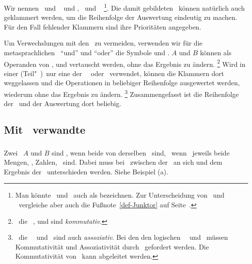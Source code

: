 Wir nennen \MtsAnd\ und \MtsOr\  und \MtsImp, \MtsRep\ und \MtsEquiv\ %
\footnote{%
	Man könnte \Metaoperationen\ und \Metarelationen\ auch als  bezeichnen. Zur Unterscheidung von \Operationen\ und \Relationen\ vergleiche aber auch die Fußnote~\ref{def-Junktor} auf Seite~\pageref{def-Junktor}.
}.
Die damit gebildeten \Aussagen\ können natürlich auch geklammert werden, um die Reihenfolge der Auswertung eindeutig zu machen.
Für den Fall fehlender Klammern sind ihre Prioritäten  angegeben.

Um Verwechslungen mit den \Junktoren\ zu vermeiden, verwenden wir für die metasprachlichen \Operationen\ "`und"' und "`oder"' die Symbole \chrqt{\MtsAnd} und \chrqt{\MtsOr}.
$A$ und $B$ können als Operanden von \chrqt{\MtsEquiv}, \chrqt{\MtsAnd} und \chrqt{\MtsOr} vertauscht werden, ohne das Ergebnis zu ändern.%
\footnote{%
	\textDh\ die \Operationen\ \chrqt{\MtsEquiv}, \chrqt{\MtsAnd} und \chrqt{\MtsOr} sind \emph{kommutativ}.
}
Wird in einer (Teil"~)\Aussage\ nur eine der \Operationen\ \MtsAnd\ oder \MtsOr\ verwendet, können die Klammern dort weggelassen und die Operationen in beliebiger Reihenfolge ausgewertet werden, wiederum ohne das Ergebnis zu ändern.%
\footnote{%
	\textDh\ die \Operationen\ \MtsAnd\ und \MtsOr\ sind auch \emph{assoziativ}.
	Bei den den logischen \Operationen\ \OjkAnd\ und \OjkOr\ müssen Kommutativität und Assoziativität durch \Axiome\ gefordert werden.
	Die Kommutativität von \MtsEquiv\ kann abgeleitet werden.
}
Zusammengefasst ist die Reihenfolge der \Operationen\ und der Auswertung dort beliebig.

\subsection[Mit Gleichheit verwandte Relationen]{Mit \Gleichheit\ verwandte \Relationen}
\label     {sub-Gleichheit}

\subsubsection[Vergleichbar]{\Vergleichbar}%
\label {subsub-Vergleichbar}

Zwei \Objekte\ $A$ und $B$ sind , wenn beide von derselben \Objektart\ sind, \textdh\ wenn \textzB\ jeweils beide Mengen, \Zeichenfolgen, Zahlen, \textusw\ sind.
Dabei muss bei \Formeln\ zwischen der \Formel\ an sich und dem Ergebnis der \Formel\ unterschieden werden. Siehe Beispiel (a).


